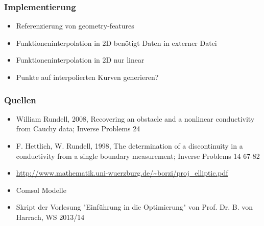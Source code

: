 \documentclass{beamer}
\begin{document}
\begin{frame}
	\frametitle{Implementierung}
	\begin{itemize}
		\item
			Referenzierung von geometry-features
		\item
			Funktioneninterpolation in 2D benötigt Daten in externer Datei
		\item
			Funktioneninterpolation in 2D nur linear
		\item
			Punkte auf interpolierten Kurven generieren?
	\end{itemize}
\end{frame}

\begin{frame}
	\frametitle{Quellen}
	\begin{itemize}
		\item
	William Rundell, 2008, Recovering an obstacle and a nonlinear conductivity from Cauchy data; Inverse Problems 24
\item
 F. Hettlich, W. Rundell, 1998, The determination of a discontinuity in a conductivity from a single boundary measurement; Inverse Problems 14 67-82
 \item
	 \url{http://www.mathematik.uni-wuerzburg.de/~borzi/proj_elliptic.pdf}
 \item
 Comsol Modelle
 \item
 Skript der Vorlesung "Einführung in die Optimierung" von Prof. Dr. B. von Harrach, WS 2013/14
	\end{itemize}
\end{frame}
\end{document}
